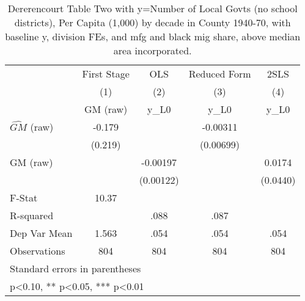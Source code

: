 \begin{table}[htbp]\centering
\def\sym#1{\ifmmode^{#1}\else\(^{#1}\)\fi}
\caption{Dererencourt Table Two with y=Number of Local Govts (no school districts), Per Capita (1,000) by decade in County 1940-70, with baseline y, division FEs, and mfg and black mig share, above median area incorporated.}
\begin{tabular}{l*{4}{c}}
\toprule
                    & First Stage   &         OLS   &Reduced Form   &        2SLS   \\
                    &\multicolumn{1}{c}{(1)}&\multicolumn{1}{c}{(2)}&\multicolumn{1}{c}{(3)}&\multicolumn{1}{c}{(4)}\\
                    &\multicolumn{1}{c}{GM  (raw)}&\multicolumn{1}{c}{y\_L0}&\multicolumn{1}{c}{y\_L0}&\multicolumn{1}{c}{y\_L0}\\
\midrule
$\hat{GM}$ (raw)    &      -0.179   &               &    -0.00311   &               \\
                    &     (0.219)   &               &   (0.00699)   &               \\
\addlinespace
GM  (raw)           &               &    -0.00197   &               &      0.0174   \\
                    &               &   (0.00122)   &               &    (0.0440)   \\
\midrule
F-Stat              &       10.37   &               &               &               \\
R-squared           &               &        .088   &        .087   &               \\
Dep Var Mean        &       1.563   &        .054   &        .054   &        .054   \\
Observations        &         804   &         804   &         804   &         804   \\
\bottomrule
\multicolumn{5}{l}{\footnotesize Standard errors in parentheses}\\
\multicolumn{5}{l}{\footnotesize * p<0.10, ** p<0.05, *** p<0.01}\\
\end{tabular}
\end{table}

